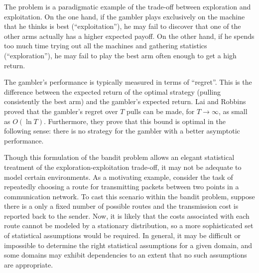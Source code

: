 \documentclass[12pt]{article}
\begin{document}
The problem is a paradigmatic example of the trade-off between exploration and
exploitation. On the one hand, if the gambler plays exclusively on the machine
that he thinks is best (``exploitation''), he may fail to discover that one of
the other arms actually has a higher expected payoff. On the other hand, if he
spends too much time trying out all the machines and gathering statistics
(``exploration''), he may fail to play the best arm often enough to get a high return.

The gambler's performance is typically measured in terms of ``regret''.
This is the difference between the expected return of the optimal
strategy (pulling consistently the best arm) and the gambler's expected return.
Lai and Robbins proved that the gambler's regret over $T$ pulls can be made,
for $T\to\infty$, as small as $O(\ln T)$. Furthermore, they prove that this bound
is optimal in the following sense: there is no strategy for the gambler
with a better asymptotic performance.

Though this formulation of the bandit problem allows an elegant
statistical treatment of the exploration-exploitation trade-off, it may not
be adequate to model certain environments. As a motivating example, consider
the task of repeatedly choosing a route for transmitting packets between two
points in a communication network.
To cast this scenario within the bandit problem, suppose there is a only
a fixed number of possible routes and the transmission cost is reported back to
the sender. Now, it is likely that the costs associated with each route cannot
be modeled by a stationary distribution, so
a more sophisticated set of statistical assumptions would be required.
In general, it may be difficult or impossible to determine the right statistical
assumptions for a given domain, and some domains may exhibit dependencies to
an extent that no such assumptions are appropriate.
\end{document}
